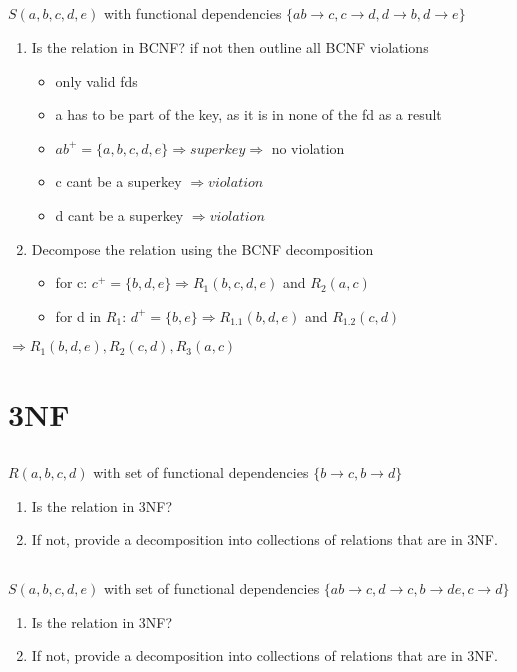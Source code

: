 \documentclass{article}
\begin{document}
\subsection*{} $S(a, b, c, d, e)$ with functional dependencies
    $\{ab \rightarrow c, c \rightarrow d, d \rightarrow b, d \rightarrow e\}$
\begin{enumerate}
    \item Is the relation in BCNF? if not then outline all BCNF violations
        \begin{itemize}
            \item only valid fds
            \item a has to be part of the key, as it is in none of the fd as a result
            \item $ab^{+} = \{a, b, c, d, e\} \Rightarrow superkey \Rightarrow$ no violation
            \item c cant be a superkey $\Rightarrow violation$
            \item d cant be a superkey $\Rightarrow violation$
        \end{itemize}
    \item Decompose the relation using the BCNF decomposition
        \begin{itemize}
            \item for c: $c^{+} = \{b, d, e\} \Rightarrow R_{1}(b, c, d, e)$ and $R_{2}(a, c)$
            \item for d in $R_{1}$: $d^{+} = \{b, e\} \Rightarrow R_{1.1}(b, d, e)$ and $R_{1.2}(c, d)$
        \end{itemize}
\end{enumerate}
$\Rightarrow R_{1}(b, d, e), R_{2}(c, d), R_{3}(a, c)$

\section{3NF}
\subsection*{} $R(a, b, c, d)$ with set of functional dependencies $\{b \rightarrow c, b \rightarrow d\}$
\begin{enumerate}
    \item Is the relation in 3NF?
    
    \item If not, provide a decomposition into collections of relations that are in 3NF.
\end{enumerate}

\subsection*{} $S(a, b, c, d, e)$ with set of functional dependencies $\{ab \rightarrow c, d \rightarrow c, b \rightarrow de, c \rightarrow d\}$
\begin{enumerate}
    \item Is the relation in 3NF?
    \item If not, provide a decomposition into collections of relations that are in 3NF.
\end{enumerate}
\end{document}
